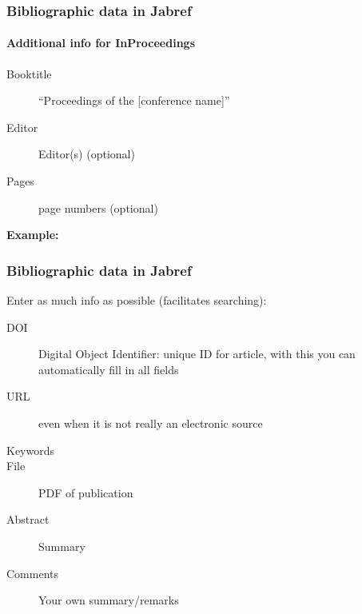 \documentclass[aspectratio=169]{beamer}
\begin{document}
\begin{frame}
  \frametitle{Bibliographic data in Jabref}
  \framesubtitle{Additional info for InProceedings}
  
  \begin{description}
    \item[Booktitle] ``Proceedings of the [conference name]''
    \item[Editor] Editor(s) (optional)
    \item[Pages] page numbers (optional)
  \end{description}
  
  \medskip
  
  \textbf{Example:}
  
\end{frame}

\begin{frame}
  \frametitle{Bibliographic data in Jabref}
  
  Enter as much info as possible (facilitates searching):
  
  \begin{description}
    \item[DOI] Digital Object Identifier: unique ID for article, with this you can automatically fill in all fields
    \item[URL] even when it is not really an electronic source
    \item[Keywords] 
    \item[File] PDF of publication
    \item[Abstract] Summary
    \item[Comments] Your own summary/remarks
  \end{description}
  
\end{frame}
\end{document}
